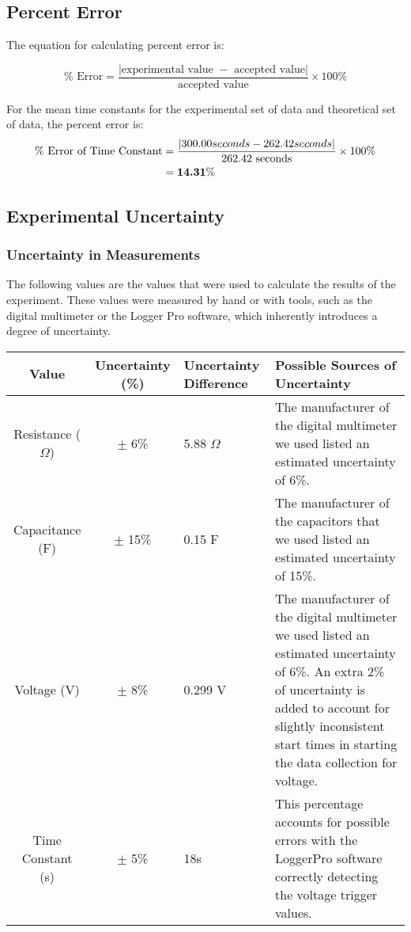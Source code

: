 \documentclass[12pt]{article}
\begin{document}
\subsection*{Percent Error} 

The equation for calculating percent error is:

$$\%\text{ Error}=\frac{|\text{experimental value }-\text{ accepted value}|}{\text{accepted value}}\times100\%$$

For the mean time constants for the experimental set of data and theoretical set of data, the percent error is:
\begin{align*}
\%\text{ Error of Time Constant}&=\frac{|300.00 seconds - 262.42 seconds|}{\text{262.42 seconds}}\times100\% \\
{}&= \text{\textbf{14.31}}\%
\end{align*}

\pagebreak
\subsection*{Experimental Uncertainty}

\subsubsection*{Uncertainty in Measurements}

The following values are the values that were used to calculate the results of the experiment. These values were measured by hand or with tools, such as the digital multimeter or the Logger Pro software, which inherently introduces a degree of uncertainty. 

\begin{table}[h!]
\centering
\begin{tabular}{||c |c | p{3cm} |p{5cm}||} 
 \hline
Value & Uncertainty (\%) & Uncertainty Difference & Possible Sources of Uncertainty  \\ [0.5ex] 
 \hline
 Resistance ($\Omega$) & $\pm$ 6\% & 5.88 $\Omega$ & The manufacturer of the digital multimeter we used listed an estimated uncertainty of 6\%.\\
 \hline
 Capacitance (F) & $\pm$ 15\% & 0.15 F & The manufacturer of the capacitors that we used listed an estimated uncertainty of 15\%.\\
 \hline
 Voltage (V) & $\pm$ 8\% & 0.299 V & The manufacturer of the digital multimeter we used listed an estimated uncertainty of 6\%. An extra 2\% of uncertainty is added to account for slightly inconsistent start times in starting the data collection for voltage. \\ 
 \hline
 Time Constant (s) & $\pm$ 5\% & 18s & This percentage accounts for possible errors with the LoggerPro software correctly detecting the voltage trigger values.  \\ 
 \hline
\end{tabular}
\end{table}
\end{document}
